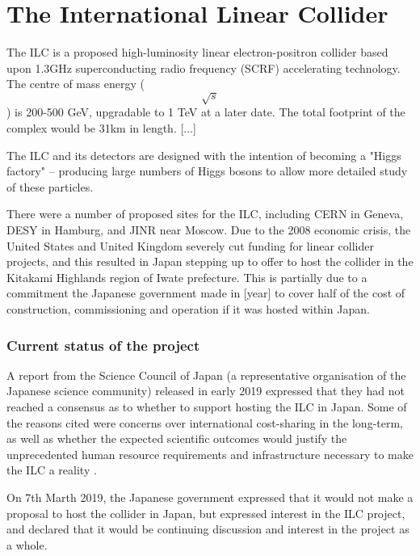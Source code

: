 \section{The International Linear Collider}

The \acrfull{ILC} is a proposed high-luminosity linear electron-positron collider based upon 1.3GHz superconducting radio frequency (SCRF) accelerating technology. The centre of mass energy ($$\sqrt{s}$$) is 200-500 GeV, upgradable to 1 TeV at a later date. The total footprint of the complex would be 31km in length. [...]

The ILC and its detectors are designed with the intention of becoming a "Higgs factory" -- producing large numbers of Higgs bosons to allow more detailed study of these particles.

There were a number of proposed sites for the ILC, including CERN in Geneva, DESY in Hamburg, and \acrshort{JINR} near Moscow. Due to the 2008 economic crisis, the United States and United Kingdom severely cut funding for linear collider projects, and this resulted in Japan stepping up to offer to host the collider in the Kitakami Highlands region of Iwate prefecture. This is partially due to a commitment the Japanese government made in [year] to cover half of the cost of construction, commissioning and operation if it was hosted within Japan.

\subsubsection*{Current status of the project}
A report from the Science Council of Japan (a representative organisation of the Japanese science community) released in early 2019 expressed that they had not reached a consensus as to whether to support hosting the ILC in Japan. Some  of the reasons cited were concerns over international cost-sharing in the long-term, as well as whether the expected scientific outcomes would justify the unprecedented human resource requirements and infrastructure necessary to make the ILC a reality \cite{linearcolliders-scj-report}.

On 7th Marth 2019, the Japanese government expressed that it would not make a proposal to host the collider in Japan, but expressed interest in the ILC project, and declared that it would be continuing discussion and interest in the project as a whole. %

